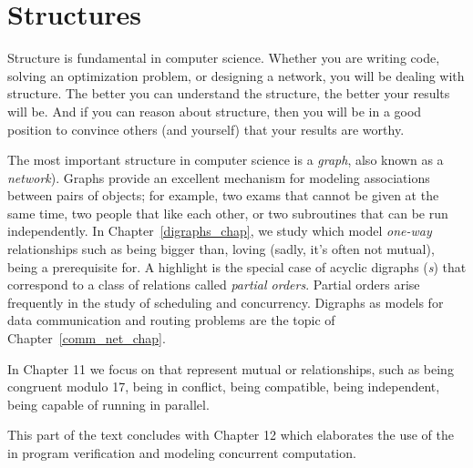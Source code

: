 \part{Structures}
\label{part:structures}

\partintro

Structure is fundamental in computer science.  Whether you are writing
code, solving an optimization problem, or designing a network, you
will be dealing with structure.  The better you can understand the
structure, the better your results will be.  And if you can reason
about structure, then you will be in a good position to convince
others (and yourself) that your results are worthy.

The most important structure in computer science is a \emph{graph},
also known as a \emph{network}).  Graphs provide an excellent
mechanism for modeling associations between pairs of objects; for
example, two exams that cannot be given at the same time, two people
that like each other, or two subroutines that can be run
independently.  In Chapter~\ref{digraphs_chap}, we study
\emph{} which model \emph{one-way} relationships
such as being bigger than, loving (sadly, it's often not mutual),
being a prerequisite for.  A highlight is the special case of acyclic
digraphs (\emph{s}) that correspond to a class of relations
called \emph{partial orders}.  Partial orders arise frequently in the
study of scheduling and concurrency.  Digraphs as models for data
communication and routing problems are the topic of
Chapter~\ref{comm_net_chap}.

In Chapter 11
we focus on \emph{} that represent mutual or
\emph{} relationships, such as being congruent modulo
17, being in conflict, being compatible, being independent, being
capable of running in parallel.

This part of the text concludes with Chapter 12
which elaborates the use of the \emph{} in program
verification and modeling concurrent computation.

\endinput
